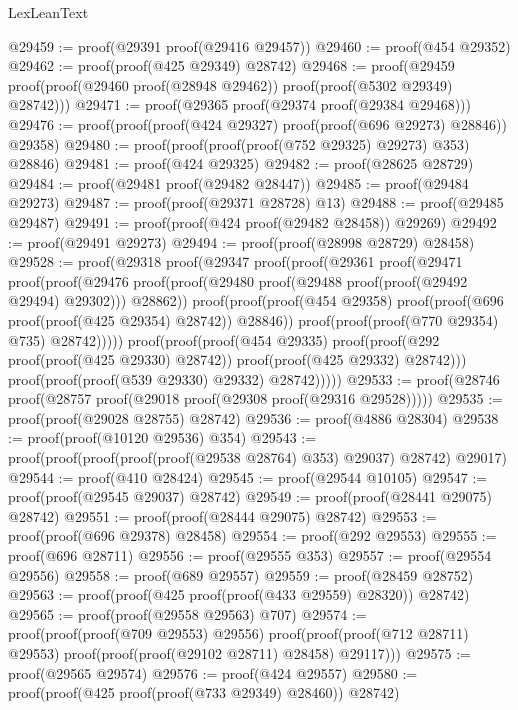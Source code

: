 \begin{lexlean}{LexLeanText}
\begin{coremodule}
@29459 := proof(@29391 proof(@29416 @29457))
@29460 := proof(@454 @29352)
@29462 := proof(proof(@425 @29349) @28742)
@29468 := proof(@29459 proof(proof(@29460 proof(@28948 @29462)) proof(proof(@5302 @29349) @28742)))
@29471 := proof(@29365 proof(@29374 proof(@29384 @29468)))
@29476 := proof(proof(proof(@424 @29327) proof(proof(@696 @29273) @28846)) @29358)
@29480 := proof(proof(proof(proof(@752 @29325) @29273) @353) @28846)
@29481 := proof(@424 @29325)
@29482 := proof(@28625 @28729)
@29484 := proof(@29481 proof(@29482 @28447))
@29485 := proof(@29484 @29273)
@29487 := proof(proof(@29371 @28728) @13)
@29488 := proof(@29485 @29487)
@29491 := proof(proof(@424 proof(@29482 @28458)) @29269)
@29492 := proof(@29491 @29273)
@29494 := proof(proof(@28998 @28729) @28458)
@29528 := proof(@29318
      proof(@29347
          proof(proof(@29361
                proof(@29471
                    proof(proof(@29476
                          proof(proof(@29480 proof(@29488 proof(proof(@29492 @29494) @29302)))
                              @28862))
                        proof(proof(proof(@454 @29358)
                              proof(proof(@696 proof(proof(@425 @29354) @28742)) @28846))
                            proof(proof(proof(@770 @29354) @735) @28742)))))
              proof(proof(proof(@454 @29335)
                    proof(proof(@292 proof(proof(@425 @29330) @28742))
                        proof(proof(@425 @29332) @28742)))
                  proof(proof(proof(@539 @29330) @29332) @28742)))))
@29533 := proof(@28746 proof(@28757 proof(@29018 proof(@29308 proof(@29316 @29528)))))
@29535 := proof(proof(@29028 @28755) @28742)
@29536 := proof(@4886 @28304)
@29538 := proof(proof(@10120 @29536) @354)
@29543 := proof(proof(proof(proof(proof(@29538 @28764) @353) @29037) @28742) @29017)
@29544 := proof(@410 @28424)
@29545 := proof(@29544 @10105)
@29547 := proof(proof(@29545 @29037) @28742)
@29549 := proof(proof(@28441 @29075) @28742)
@29551 := proof(proof(@28444 @29075) @28742)
@29553 := proof(proof(@696 @29378) @28458)
@29554 := proof(@292 @29553)
@29555 := proof(@696 @28711)
@29556 := proof(@29555 @353)
@29557 := proof(@29554 @29556)
@29558 := proof(@689 @29557)
@29559 := proof(@28459 @28752)
@29563 := proof(proof(@425 proof(proof(@433 @29559) @28320)) @28742)
@29565 := proof(proof(@29558 @29563) @707)
@29574 := proof(proof(proof(@709 @29553) @29556)
      proof(proof(proof(@712 @28711) @29553) proof(proof(proof(@29102 @28711) @28458) @29117)))
@29575 := proof(@29565 @29574)
@29576 := proof(@424 @29557)
@29580 := proof(proof(@425 proof(proof(@733 @29349) @28460)) @28742)

\end{coremodule}
\end{lexlean}
